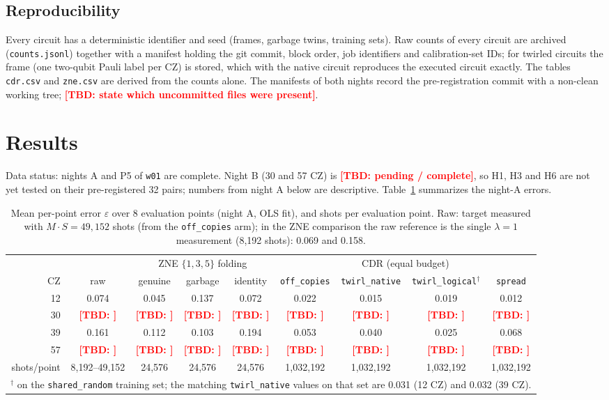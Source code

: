 \documentclass[conference]{IEEEtran}
\newcommand{\TBD}[1]{\textcolor{red}{\textbf{[TBD: #1]}}}
\newcommand{\arm}[1]{\texttt{#1}}
\begin{document}
\subsection{Reproducibility}
Every circuit has a deterministic identifier and seed (frames, garbage twins, training sets).
Raw counts of every circuit are archived (\texttt{counts.jsonl}) together with a manifest holding
the git commit, block order, job identifiers and calibration-set IDs; for twirled circuits the
frame (one two-qubit Pauli label per CZ) is stored, which with the native circuit reproduces
the executed circuit exactly. The tables \texttt{cdr.csv} and \texttt{zne.csv} are derived from the
counts alone. The manifests of both nights record the pre-registration commit with a
non-clean working tree; \TBD{state which uncommitted files were present}.

\section{Results}\label{sec:results}

Data status: nights A and P5 of \texttt{w01} are complete. Night B (30 and 57 CZ) is
\TBD{pending / complete}, so H1, H3 and H6 are not yet tested on their pre-registered 32 pairs;
numbers from night A below are descriptive. Table~\ref{tab:main} summarizes the night-A errors.

\begin{table}[t]
\caption{Mean per-point error $\varepsilon$ over 8 evaluation points (night A, OLS fit), and shots
per evaluation point. Raw: target measured with $M\cdot S=49{,}152$ shots (from the
\arm{off\_copies} arm); in the ZNE comparison the raw reference is the single $\lambda=1$
measurement (8,192 shots): 0.069 and 0.158.}
\label{tab:main}
\centering\footnotesize
\begin{tabular}{@{}rcccccccc@{}}
\toprule
 & & \multicolumn{3}{c}{ZNE $\{1,3,5\}$ folding} & \multicolumn{4}{c}{CDR (equal budget)} \\
\cmidrule(lr){3-5}\cmidrule(l){6-9}
CZ & raw & genuine & garbage & identity & \arm{off\_copies} & \arm{twirl\_native} & \arm{twirl\_logical}$^\dagger$ & \arm{spread} \\
\midrule
12 & 0.074 & 0.045 & 0.137 & 0.072 & 0.022 & 0.015 & 0.019 & 0.012 \\
30 & \TBD{} & \TBD{} & \TBD{} & \TBD{} & \TBD{} & \TBD{} & \TBD{} & \TBD{} \\
39 & 0.161 & 0.112 & 0.103 & 0.194 & 0.053 & 0.040 & 0.025 & 0.068 \\
57 & \TBD{} & \TBD{} & \TBD{} & \TBD{} & \TBD{} & \TBD{} & \TBD{} & \TBD{} \\
\midrule
shots/point & 8,192--49,152 & 24,576 & 24,576 & 24,576 & 1,032,192 & 1,032,192 & 1,032,192 & 1,032,192 \\
\bottomrule
\multicolumn{9}{l}{$^\dagger$ on the \arm{shared\_random} training set; the matching
\arm{twirl\_native} values on that set are 0.031 (12 CZ) and 0.032 (39 CZ).}
\end{tabular}
\end{table}
\end{document}
